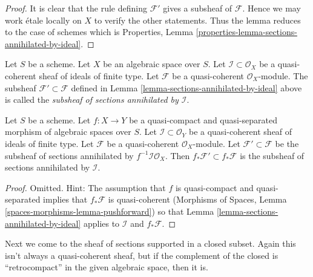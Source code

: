 \begin{proof}
It is clear that the rule defining $\mathcal{F}'$ gives a subsheaf
of $\mathcal{F}$. Hence we may work \'etale locally on $X$ to verify
the other statements. Thus the lemma reduces to the case of schemes
which is
Properties, Lemma \ref{properties-lemma-sections-annihilated-by-ideal}.
\end{proof}

\begin{definition}
\label{definition-subsheaf-sections-annihilated-by-ideal}
Let $S$ be a scheme. Let $X$ be an algebraic space over $S$.
Let $\mathcal{I} \subset \mathcal{O}_X$ be a quasi-coherent
sheaf of ideals of finite type.
Let $\mathcal{F}$ be a quasi-coherent $\mathcal{O}_X$-module.
The subsheaf $\mathcal{F}' \subset \mathcal{F}$ defined in
Lemma \ref{lemma-sections-annihilated-by-ideal} above is called
the {\it subsheaf of sections annihilated by $\mathcal{I}$}.
\end{definition}

\begin{lemma}
\label{lemma-push-sections-annihilated-by-ideal}
Let $S$ be a scheme.
Let $f : X \to Y$ be a quasi-compact and quasi-separated morphism
of algebraic spaces over $S$.
Let $\mathcal{I} \subset \mathcal{O}_Y$ be a quasi-coherent
sheaf of ideals of finite type. Let $\mathcal{F}$ be a quasi-coherent
$\mathcal{O}_X$-module. Let $\mathcal{F}' \subset \mathcal{F}$
be the subsheaf of sections annihilated by $f^{-1}\mathcal{I}\mathcal{O}_X$.
Then $f_*\mathcal{F}' \subset f_*\mathcal{F}$ is the subsheaf
of sections annihilated by $\mathcal{I}$.
\end{lemma}

\begin{proof}
Omitted. Hint: The assumption that $f$ is quasi-compact and
quasi-separated implies that $f_*\mathcal{F}$ is quasi-coherent
(Morphisms of Spaces, Lemma \ref{spaces-morphisms-lemma-pushforward})
so that Lemma \ref{lemma-sections-annihilated-by-ideal} applies
to $\mathcal{I}$ and $f_*\mathcal{F}$.
\end{proof}

\noindent
Next we come to the sheaf of sections supported in a closed subset.
Again this isn't always a quasi-coherent sheaf, but if the complement
of the closed is ``retrocompact'' in the given algebraic space, then
it is.

